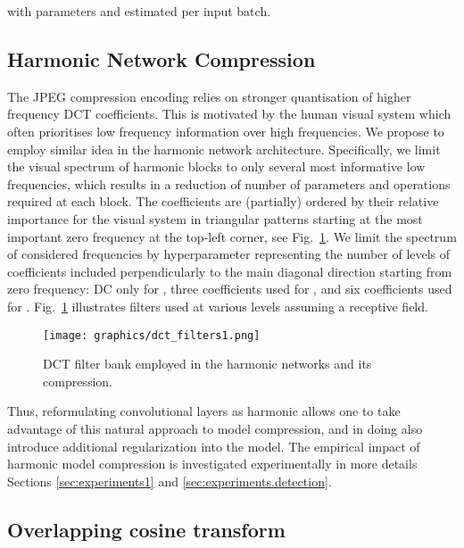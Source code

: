 \documentclass[12pt,a4paper]{article}
\begin{document}
with parameters  and  estimated per input batch.

\subsection{Harmonic Network Compression} \label{sec:method.subsample}


The JPEG compression encoding relies on stronger quantisation of higher frequency DCT coefficients. This is motivated by the human visual system which often prioritises low frequency information over high frequencies. We propose to employ similar idea in the harmonic network architecture. Specifically, we limit the visual spectrum of harmonic blocks to only several most informative low frequencies, which results in a reduction of number of parameters and operations required at each block. The coefficients are (partially) ordered by their relative importance for the visual system in triangular patterns starting at the most important zero frequency at the top-left corner, see Fig.~\ref{fig:filters}. We limit the spectrum of considered frequencies by hyperparameter  representing the number of levels of coefficients included perpendicularly to the main diagonal direction starting from zero frequency: DC only for , three coefficients used for , and six coefficients used for .
Fig.~\ref{fig:filters} illustrates filters used at various levels assuming a  receptive field.
\begin{figure}[t]
\begin{center}
   \texttt{[image: graphics/dct\_filters1.png]}
\end{center}
\vspace{-.5\baselineskip}
   \caption{  DCT filter bank employed in the harmonic networks and its compression.}
\label{fig:filters}
\end{figure} 
Thus, reformulating convolutional layers as harmonic allows one  to take advantage of this natural approach to model compression, and in doing also introduce additional regularization into the model. The empirical impact of harmonic model compression is  investigated experimentally in more details Sections \ref{sec:experiments1} and \ref{sec:experiments.detection}.

\subsection{Overlapping cosine transform} \label{sec:overlap_dct}
\end{document}
